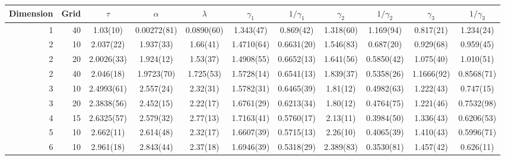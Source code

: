 \begin{tabular}{rr|ccccccccc}
\toprule
Dimension & Grid & $\tau$ & $\alpha$ & $\lambda$ & $\gamma_1$ & $1/\gamma_1$ & $\gamma_2$ & $1/\gamma_2$ & $\gamma_3$ & $1/\gamma_3$ \\
\midrule
1 & 40 & 1.03(10) & 0.00272(81) & 0.0890(60) & 1.343(47) & 0.869(42) & 1.318(60) & 1.169(94) & 0.817(21) & 1.234(24) \\
2 & 10 & 2.037(22) & 1.937(33) & 1.66(41) & 1.4710(64) & 0.6631(20) & 1.546(83) & 0.687(20) & 0.929(68) & 0.959(45) \\
2 & 20 & 2.0026(33) & 1.924(12) & 1.53(37) & 1.4908(55) & 0.6652(13) & 1.641(56) & 0.5850(42) & 1.075(40) & 1.010(51) \\
2 & 40 & 2.046(18) & 1.9723(70) & 1.725(53) & 1.5728(14) & 0.6541(13) & 1.839(37) & 0.5358(26) & 1.1666(92) & 0.8568(71) \\
3 & 10 & 2.4993(61) & 2.557(24) & 2.32(31) & 1.5782(31) & 0.6465(39) & 1.81(12) & 0.4982(63) & 1.222(43) & 0.747(15) \\
3 & 20 & 2.3838(56) & 2.452(15) & 2.22(17) & 1.6761(29) & 0.6213(34) & 1.80(12) & 0.4764(75) & 1.221(46) & 0.7532(98) \\
4 & 15 & 2.6325(57) & 2.579(32) & 2.77(13) & 1.7163(41) & 0.5760(17) & 2.13(11) & 0.3984(50) & 1.336(43) & 0.6206(53) \\
5 & 10 & 2.662(11) & 2.614(48) & 2.32(17) & 1.6607(39) & 0.5715(13) & 2.26(10) & 0.4065(39) & 1.410(43) & 0.5996(71) \\
6 & 10 & 2.961(18) & 2.843(44) & 2.37(18) & 1.6946(39) & 0.5318(29) & 2.389(83) & 0.3530(81) & 1.457(42) & 0.626(11) \\
\bottomrule
\end{tabular}
